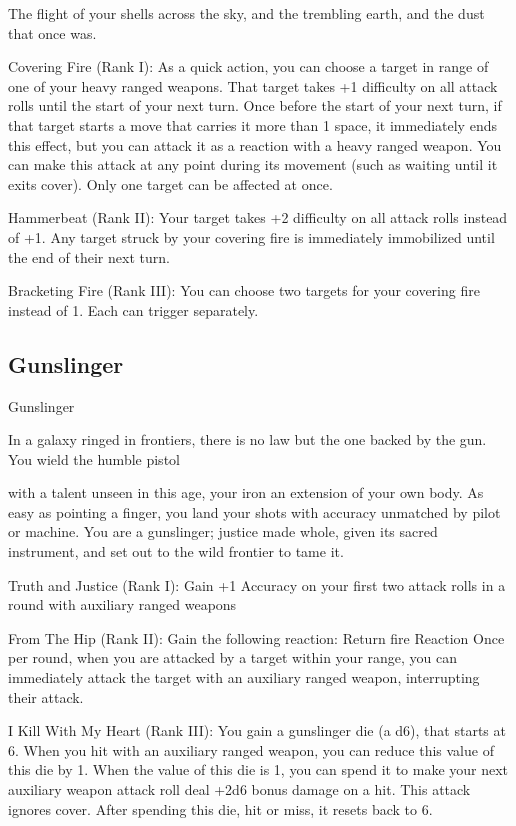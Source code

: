  The flight of your shells across the sky, and the trembling earth, and the dust that once was.
 
Covering Fire (Rank I): As a quick action, you can choose a target in range of one of your heavy  
ranged weapons. That target takes +1 difficulty on all attack rolls until the start of your next turn.  
Once before the start of your next turn, if that target starts a move that carries it more than 1  
space, it immediately ends this effect, but you can attack it as a reaction with a heavy ranged  
weapon. You can make this attack at any point during its movement (such as waiting until it exits  
cover). Only one target can be affected at once.
 
 Hammerbeat (Rank II): Your target takes +2 difficulty on all attack rolls instead of +1. Any target  
struck by your covering fire is immediately immobilized until the end of their next turn.
 
 Bracketing Fire (Rank III): You can choose two targets for your covering fire instead of 1. Each  
can trigger separately.
 
\subsection{Gunslinger}

                                                  Gunslinger  

In a galaxy ringed in frontiers, there is no law but the one backed by the gun. You wield the humble pistol  

with a talent unseen in this age, your iron an extension of your own body. As easy as pointing a finger, you  
land your shots with accuracy unmatched by pilot or machine. You are a gunslinger; justice made whole,  
given its sacred instrument, and set out to the wild frontier to tame it.   

Truth and Justice (Rank I): Gain +1 Accuracy on your first two attack rolls in a round with  
auxiliary ranged weapons
 
From The Hip (Rank II): Gain the following reaction:  
         Return fire  
         Reaction  
         Once per round, when you are attacked by a target within your range, you can  
         immediately attack the target with an auxiliary ranged weapon, interrupting their attack.
 
I Kill With My Heart (Rank III): You gain a gunslinger die (a d6), that starts at 6. When you hit  
with an auxiliary ranged weapon, you can reduce this value of this die by 1. When the value of  
this die is 1, you can spend it to make your next auxiliary weapon attack roll deal +2d6 bonus  
damage on a hit. This attack ignores cover. After spending this die, hit or miss, it resets back to  
6.
 
